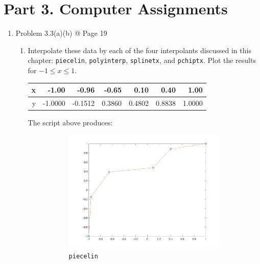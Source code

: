 \documentclass[10pt]{report}
\begin{document}
\section*{Part 3. Computer Assignments}
\begin{enumerate}
	\item 
	Problem 3.3(a)(b) @ Page 19
	\begin{enumerate}
		\item
		Interpolate these data by each of the four interpolants discussed in this
		chapter: \verb|piecelin|, \verb|polyinterp|, \verb|splinetx|, and \verb|pchiptx|. Plot the results for $-1 \le x \le 1$.
		\begin{table}[H]
			\centering
			\begin{tabular}{*{7}{N}} \toprule
				x & -1.00 & -0.96 & -0.65 & 0.10 & 0.40 & 1.00\\ \midrule
				y & -1.0000 & -0.1512 & 0.3860 & 0.4802 & 0.8838 & 1.0000\\
				\bottomrule
			\end{tabular}
		\end{table}
		
		The script above produces:
		\begin{figure}[ht]
			\vspace{-2ex}
			\begin{subfigure}[b]{0.5\linewidth}
				\centering
				\includegraphics[width=\linewidth]{piecelin.png}
				\vspace{-5ex} 
				\caption*{\texttt{piecelin}}
			\end{subfigure}
			\begin{subfigure}[b]{0.5\linewidth}

\end{subfigure}
\end{figure}
\end{enumerate}
\end{enumerate}
\end{document}
